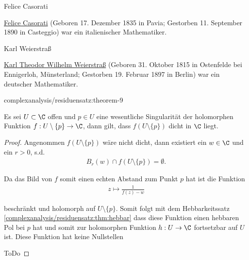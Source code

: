 \documentclass[letterpaper,10pt,german]{jupyterBook}
\begin{document}
\begin{emphBox}{Felice Casorati}{}

\par
\href{https://de.wikipedia.org/wiki/Felice\_Casorati\_(Mathematiker)}{Felice Casorati} (Geboren 17. Dezember 1835 in Pavia; Gestorben 11. September 1890 in Casteggio) war ein italienischer Mathematiker.
\end{emphBox}

\begin{emphBox}{Karl Weierstraß}{}

\par
\href{https://de.wikipedia.org/wiki/Karl\_Weierstra\%C3\%9F}{Karl Theodor Wilhelm Weierstraß} (Geboren 31. Oktober 1815 in Ostenfelde bei Ennigerloh, Münsterland; Gestorben 19. Februar 1897 in Berlin) war ein deutscher Mathematiker.
\end{emphBox}
\begin{theorem}{}{complexanalysis/residuensatz:theorem-9}



\par
Es sei \(U \subset \C\) offen und \(p\in U\) eine wesentliche Singularität der holomorphen Funktion \(f:U\setminus\{p\}\to\C\), dann gilt, dass \(f(U\setminus\{p\})\) dicht in \(\C\) liegt.
\end{theorem}

\begin{proof}
 Angenommen \(f(U\setminus\{p\})\) wäre nicht dicht, dann existiert ein \(w\in\C\) und ein \(r>0\), s.d.
\begin{align*}
B_r(w) \cap f(U\setminus\{p\}) = \emptyset.
\end{align*}
\par
Da das Bild von \(f\) somit einen echten Abstand zum Punkt \(p\) hat ist die Funktion
\begin{align*}
z\mapsto\frac{1}{f(z) - w}
\end{align*}
\par
beschränkt und holomorph auf \(U\setminus\{p\}\). Somit folgt mit dem Hebbarkeitssatz \cref{complexanalysis/residuensatz:thm:hebbar}  dass diese Funktion einen hebbaren Pol bei \(p\) hat und somit zur holomorphen Funktion \(h:U\to\C\) fortsetzbar auf \(U\) ist. Diese Funktion hat keine Nullstellen

\par
ToDo
\end{proof}
\end{document}
